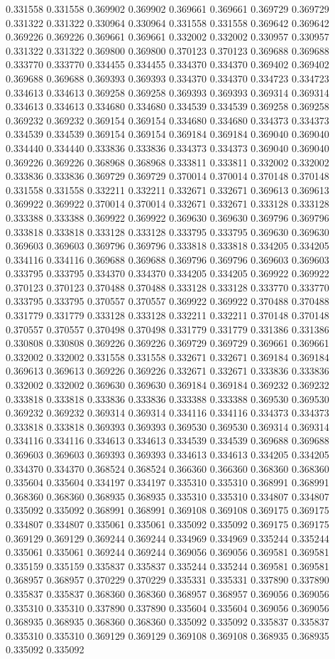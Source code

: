 0.331558 0.331558 0.369902 0.369902 0.369661 0.369661 0.369729 0.369729 0.331322 0.331322 0.330964 0.330964 0.331558 0.331558 0.369642 0.369642 0.369226 0.369226 0.369661 0.369661 0.332002 0.332002 0.330957 0.330957 0.331322 0.331322 0.369800 0.369800 0.370123 0.370123 0.369688 0.369688 0.333770 0.333770 0.334455 0.334455 0.334370 0.334370 0.369402 0.369402 0.369688 0.369688 0.369393 0.369393 0.334370 0.334370 0.334723 0.334723 0.334613 0.334613 0.369258 0.369258 0.369393 0.369393 0.369314 0.369314 0.334613 0.334613 0.334680 0.334680 0.334539 0.334539 0.369258 0.369258 0.369232 0.369232 0.369154 0.369154 0.334680 0.334680 0.334373 0.334373 0.334539 0.334539 0.369154 0.369154 0.369184 0.369184 0.369040 0.369040 0.334440 0.334440 0.333836 0.333836 0.334373 0.334373 0.369040 0.369040 0.369226 0.369226 0.368968 0.368968 0.333811 0.333811 0.332002 0.332002 0.333836 0.333836 0.369729 0.369729 0.370014 0.370014 0.370148 0.370148 0.331558 0.331558 0.332211 0.332211 0.332671 0.332671 0.369613 0.369613 0.369922 0.369922 0.370014 0.370014 0.332671 0.332671 0.333128 0.333128 0.333388 0.333388 0.369922 0.369922 0.369630 0.369630 0.369796 0.369796 0.333818 0.333818 0.333128 0.333128 0.333795 0.333795 0.369630 0.369630 0.369603 0.369603 0.369796 0.369796 0.333818 0.333818 0.334205 0.334205 0.334116 0.334116 0.369688 0.369688 0.369796 0.369796 0.369603 0.369603 0.333795 0.333795 0.334370 0.334370 0.334205 0.334205 0.369922 0.369922 0.370123 0.370123 0.370488 0.370488 0.333128 0.333128 0.333770 0.333770 0.333795 0.333795 0.370557 0.370557 0.369922 0.369922 0.370488 0.370488 0.331779 0.331779 0.333128 0.333128 0.332211 0.332211 0.370148 0.370148 0.370557 0.370557 0.370498 0.370498 0.331779 0.331779 0.331386 0.331386 0.330808 0.330808 0.369226 0.369226 0.369729 0.369729 0.369661 0.369661 0.332002 0.332002 0.331558 0.331558 0.332671 0.332671 0.369184 0.369184 0.369613 0.369613 0.369226 0.369226 0.332671 0.332671 0.333836 0.333836 0.332002 0.332002 0.369630 0.369630 0.369184 0.369184 0.369232 0.369232 0.333818 0.333818 0.333836 0.333836 0.333388 0.333388 0.369530 0.369530 0.369232 0.369232 0.369314 0.369314 0.334116 0.334116 0.334373 0.334373 0.333818 0.333818 0.369393 0.369393 0.369530 0.369530 0.369314 0.369314 0.334116 0.334116 0.334613 0.334613 0.334539 0.334539 0.369688 0.369688 0.369603 0.369603 0.369393 0.369393 0.334613 0.334613 0.334205 0.334205 0.334370 0.334370 0.368524 0.368524 0.366360 0.366360 0.368360 0.368360 0.335604 0.335604 0.334197 0.334197 0.335310 0.335310 0.368991 0.368991 0.368360 0.368360 0.368935 0.368935 0.335310 0.335310 0.334807 0.334807 0.335092 0.335092 0.368991 0.368991 0.369108 0.369108 0.369175 0.369175 0.334807 0.334807 0.335061 0.335061 0.335092 0.335092 0.369175 0.369175 0.369129 0.369129 0.369244 0.369244 0.334969 0.334969 0.335244 0.335244 0.335061 0.335061 0.369244 0.369244 0.369056 0.369056 0.369581 0.369581 0.335159 0.335159 0.335837 0.335837 0.335244 0.335244 0.369581 0.369581 0.368957 0.368957 0.370229 0.370229 0.335331 0.335331 0.337890 0.337890 0.335837 0.335837 0.368360 0.368360 0.368957 0.368957 0.369056 0.369056 0.335310 0.335310 0.337890 0.337890 0.335604 0.335604 0.369056 0.369056 0.368935 0.368935 0.368360 0.368360 0.335092 0.335092 0.335837 0.335837 0.335310 0.335310 0.369129 0.369129 0.369108 0.369108 0.368935 0.368935 0.335092 0.335092 